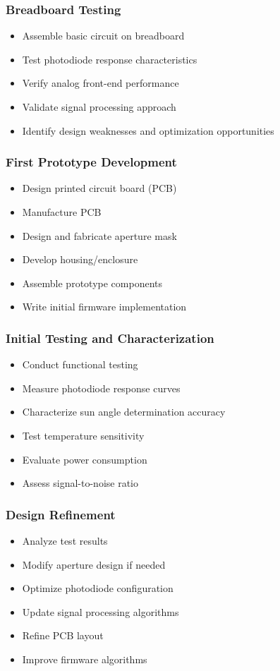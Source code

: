 \subsubsection*{Breadboard Testing}
\begin{itemize}
  \item Assemble basic circuit on breadboard
  \item Test photodiode response characteristics
  \item Verify analog front-end performance
  \item Validate signal processing approach
  \item Identify design weaknesses and optimization opportunities
\end{itemize}

\subsubsection*{First Prototype Development}
\begin{itemize}
  \item Design printed circuit board (PCB)
  \item Manufacture PCB
  \item Design and fabricate aperture mask
  \item Develop housing/enclosure
  \item Assemble prototype components
  \item Write initial firmware implementation
\end{itemize}

\subsubsection*{Initial Testing and Characterization}
\begin{itemize}
  \item Conduct functional testing
  \item Measure photodiode response curves
  \item Characterize sun angle determination accuracy
  \item Test temperature sensitivity
  \item Evaluate power consumption
  \item Assess signal-to-noise ratio
\end{itemize}

\subsubsection*{Design Refinement}
\begin{itemize}
  \item Analyze test results
  \item Modify aperture design if needed
  \item Optimize photodiode configuration
  \item Update signal processing algorithms
  \item Refine PCB layout
  \item Improve firmware algorithms
\end{itemize}

